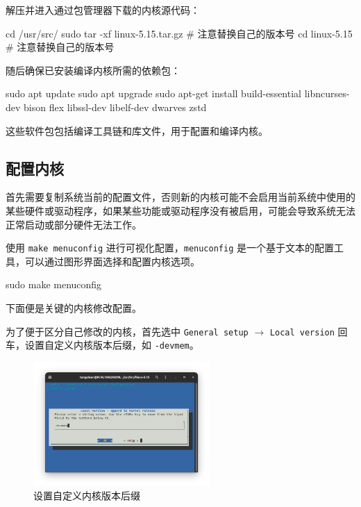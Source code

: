 解压并进入通过包管理器下载的内核源代码：\begin{bashcode}
    cd /usr/src/
    sudo tar -xf linux-5.15.tar.gz # 注意替换自己的版本号
    cd linux-5.15 # 注意替换自己的版本号
\end{bashcode}

随后确保已安装编译内核所需的依赖包：
\begin{bashcode}
    sudo apt update
    sudo apt upgrade
    sudo apt-get install build-essential libncurses-dev bison flex libssl-dev libelf-dev dwarves zstd
\end{bashcode}

这些软件包包括编译工具链和库文件，用于配置和编译内核。

\subsection{配置内核}

首先需要复制系统当前的配置文件，否则新的内核可能不会启用当前系统中使用的某些硬件或驱动程序，如果某些功能或驱动程序没有被启用，可能会导致系统无法正常启动或部分硬件无法工作。

使用 \texttt{make menuconfig} 进行可视化配置，\texttt{menuconfig} 是一个基于文本的配置工具，可以通过图形界面选择和配置内核选项。
\begin{bashcode}
    sudo make menuconfig
\end{bashcode}

下面便是关键的内核修改配置。

为了便于区分自己修改的内核，首先选中 \texttt{General setup} $\to$ \texttt{Local version} 回车，设置自定义内核版本后缀，如 \texttt{-devmem}。
\begin{figure}[htbp]
    \centering
    \includegraphics[width=0.6\textwidth]{images/devmem.png}
    \caption{设置自定义内核版本后缀}
\end{figure}

